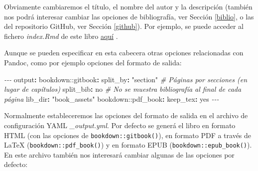 \documentclass[
]{book}
\newenvironment{Shaded}{\begin{snugshade}}{\end{snugshade}}
\newcommand{\AttributeTok}[1]{\textcolor[rgb]{0.77,0.63,0.00}{#1}}
\newcommand{\CharTok}[1]{\textcolor[rgb]{0.31,0.60,0.02}{#1}}
\newcommand{\CommentTok}[1]{\textcolor[rgb]{0.56,0.35,0.01}{\textit{#1}}}
\newcommand{\FunctionTok}[1]{\textcolor[rgb]{0.00,0.00,0.00}{#1}}
\newcommand{\KeywordTok}[1]{\textcolor[rgb]{0.13,0.29,0.53}{\textbf{#1}}}
\newcommand{\PreprocessorTok}[1]{\textcolor[rgb]{0.56,0.35,0.01}{\textit{#1}}}
\newcommand{\StringTok}[1]{\textcolor[rgb]{0.31,0.60,0.02}{#1}}
\theoremstyle{definition}
\theoremstyle{definition}
\theoremstyle{definition}
\theoremstyle{definition}
\theoremstyle{remark}
\begin{document}
Obviamente cambiaremos el título, el nombre del autor y la descripción
(también nos podrá interesar cambiar las opciones de bibliografía, ver Sección \ref{biblio},
o las del repositorio GitHub, ver Sección \ref{github}).
Por ejemplo, se puede acceder al fichero \emph{index.Rmd} de este libro
\href{https://github.com/rubenfcasal/bookdown_intro/raw/master/index.Rmd}{aquí} .

Aunque se pueden especificar en esta cabecera otras opciones relacionadas con Pandoc,
como por ejemplo opciones del formato de salida:

\begin{Shaded}
\begin{Highlighting}[]
\PreprocessorTok{{-}{-}{-}}
\FunctionTok{output}\KeywordTok{:}
\AttributeTok{  bookdown:}\FunctionTok{:gitbook}\KeywordTok{:}
\AttributeTok{    }\FunctionTok{split\_by}\KeywordTok{:}\AttributeTok{ }\StringTok{"section"}\CommentTok{       \# Páginas por secciones (en lugar de capítulos)}
\AttributeTok{    }\FunctionTok{split\_bib}\KeywordTok{:}\AttributeTok{ }\CharTok{no}\CommentTok{             \# No se muestra bibliografía al final de cada página}
\AttributeTok{    }\FunctionTok{lib\_dir}\KeywordTok{:}\AttributeTok{ }\StringTok{"book\_assets"}
\AttributeTok{  bookdown:}\FunctionTok{:pdf\_book}\KeywordTok{:}
\AttributeTok{    }\FunctionTok{keep\_tex}\KeywordTok{:}\AttributeTok{ }\CharTok{yes}
\PreprocessorTok{{-}{-}{-}}
\end{Highlighting}
\end{Shaded}

Normalmente estableceremos las opciones del formato de salida en el
archivo de configuración YAML \emph{\_output.yml}.
Por defecto se generá el libro en formato HTML (con las opciones de \texttt{bookdown::gitbook()}),
en formato PDF a través de LaTeX (\texttt{bookdown::pdf\_book()}) y en formato EPUB (\texttt{bookdown::epub\_book()}).
En este archivo también nos interesará cambiar algunas de las opciones por defecto:
\end{document}

